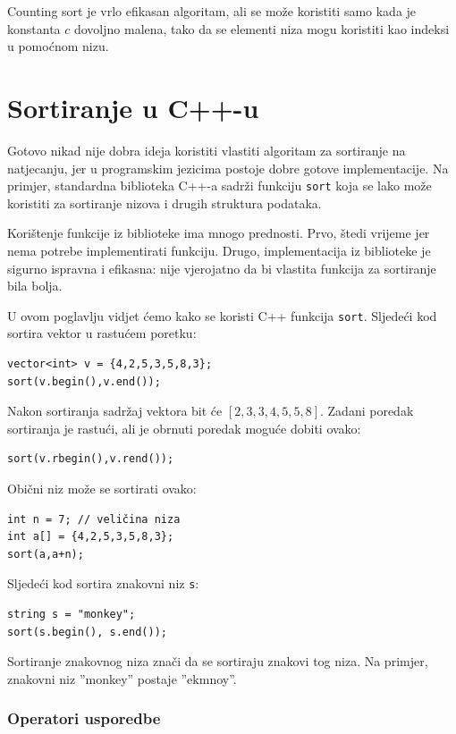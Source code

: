 Counting sort je vrlo efikasan algoritam,
ali se može koristiti samo kada je konstanta $c$
dovoljno malena, tako da se elementi niza mogu
koristiti kao indeksi u pomoćnom nizu.

\section{Sortiranje u C++-u}


Gotovo nikad nije dobra ideja koristiti
vlastiti algoritam za sortiranje
na natjecanju, jer u programskim jezicima
postoje dobre gotove implementacije.
Na primjer, standardna biblioteka C++-a sadrži
funkciju \texttt{sort} koja se lako može koristiti za
sortiranje nizova i drugih struktura podataka.

Korištenje funkcije iz biblioteke ima mnogo prednosti.
Prvo, štedi vrijeme jer nema potrebe
implementirati funkciju.
Drugo, implementacija iz biblioteke je
sigurno ispravna i efikasna: nije vjerojatno
da bi vlastita funkcija za sortiranje bila bolja.

U ovom poglavlju vidjet ćemo kako se koristi
C++ funkcija \texttt{sort}.
Sljedeći kod sortira
vektor u rastućem poretku:
\begin{lstlisting}
vector<int> v = {4,2,5,3,5,8,3};
sort(v.begin(),v.end());
\end{lstlisting}
Nakon sortiranja sadržaj
vektora bit će
$[2,3,3,4,5,5,8]$.
Zadani poredak sortiranja je rastući,
ali je obrnuti poredak moguće dobiti ovako:
\begin{lstlisting}
sort(v.rbegin(),v.rend());
\end{lstlisting}
Obični niz može se sortirati ovako:
\begin{lstlisting}
int n = 7; // veličina niza
int a[] = {4,2,5,3,5,8,3};
sort(a,a+n);
\end{lstlisting}
\newpage
Sljedeći kod sortira znakovni niz \texttt{s}:
\begin{lstlisting}
string s = "monkey";
sort(s.begin(), s.end());
\end{lstlisting}
Sortiranje znakovnog niza znači da se sortiraju
znakovi tog niza.
Na primjer, znakovni niz ''monkey'' postaje ''ekmnoy''.

\subsubsection{Operatori usporedbe}


